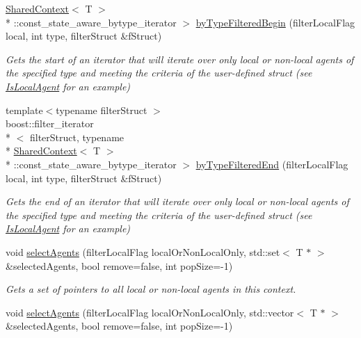 \begin{DoxyCompactItemize}
\hyperlink{classrepast_1_1_shared_context}{Shared\-Context}$<$ T $>$\\*
\-::const\-\_\-state\-\_\-aware\-\_\-bytype\-\_\-iterator $>$ \hyperlink{classrepast_1_1_shared_context_a44bb645e769bc49417b108c7663a5c92}{by\-Type\-Filtered\-Begin} (filter\-Local\-Flag local, int type, filter\-Struct \&f\-Struct)
\begin{DoxyCompactList}\small\item\em Gets the start of an iterator that will iterate over only local or non-\/local agents of the specified type and meeting the criteria of the user-\/defined struct (see \hyperlink{structrepast_1_1_is_local_agent}{Is\-Local\-Agent} for an example) \end{DoxyCompactList}\item 
{\footnotesize template$<$typename filter\-Struct $>$ }\\boost\-::filter\-\_\-iterator\\*
$<$ filter\-Struct, typename \\*
\hyperlink{classrepast_1_1_shared_context}{Shared\-Context}$<$ T $>$\\*
\-::const\-\_\-state\-\_\-aware\-\_\-bytype\-\_\-iterator $>$ \hyperlink{classrepast_1_1_shared_context_a3ed0899e2b6f1c8f53d96f0555e460f0}{by\-Type\-Filtered\-End} (filter\-Local\-Flag local, int type, filter\-Struct \&f\-Struct)
\begin{DoxyCompactList}\small\item\em Gets the end of an iterator that will iterate over only local or non-\/local agents of the specified type and meeting the criteria of the user-\/defined struct (see \hyperlink{structrepast_1_1_is_local_agent}{Is\-Local\-Agent} for an example) \end{DoxyCompactList}\item 
void \hyperlink{classrepast_1_1_shared_context_a216c8e1c03beae6861488b09ae52a6f7}{select\-Agents} (filter\-Local\-Flag local\-Or\-Non\-Local\-Only, std\-::set$<$ T $\ast$ $>$ \&selected\-Agents, bool remove=false, int pop\-Size=-\/1)
\begin{DoxyCompactList}\small\item\em Gets a set of pointers to all local or non-\/local agents in this context. \end{DoxyCompactList}\item 
void \hyperlink{classrepast_1_1_shared_context_a630dc3ce28e596a074d0345a70df5a84}{select\-Agents} (filter\-Local\-Flag local\-Or\-Non\-Local\-Only, std\-::vector$<$ T $\ast$ $>$ \&selected\-Agents, bool remove=false, int pop\-Size=-\/1)

\end{DoxyCompactItemize}
